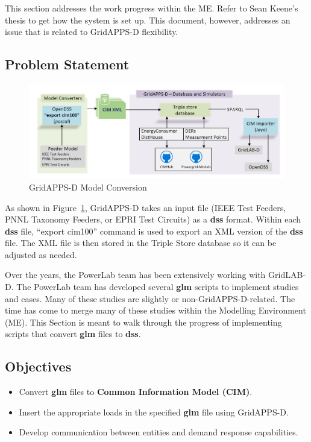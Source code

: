 This section addresses the work progress within the ME. Refer to Sean Keene's thesis to get how the system is set up. This document, however, addresses an issue that is related to GridAPPS-D flexibility. 

\subsection{Problem Statement}

\begin{figure}[htp!]
    \centering
    \includegraphics[width=0.7\columnwidth]{Pictures/model_conversion.png}
    \caption{GridAPPS-D Model Conversion}
    \label{fig:me_gridappsd}
\end{figure}

As shown in Figure~\ref{fig:me_gridappsd}, GridAPPS-D takes an input file (IEEE Test Feeders, PNNL Taxonomy Feeders, or EPRI Test Circuits) as a \textbf{dss} format. Within each \textbf{dss} file,
``export cim100'' command is used to export an XML version of the \textbf{dss} file. The XML file is then stored in the Triple Store database so it can be adjusted as needed. 


Over the years, the PowerLab team has been extensively working with GridLAB-D. The PowerLab team has developed several \textbf{glm} scripts to implement studies and cases. Many of these studies are slightly or non-GridAPPS-D-related. 
The time has come to merge many of these studies within the Modelling Environment (ME). This Section is meant to walk through the progress of implementing scripts that convert \textbf{glm} files to \textbf{dss}.

\subsection{Objectives}
\begin{itemize}
    \item Convert \textbf{glm} files to \textbf{Common Information Model (CIM)}.
    \item Insert the appropriate loads in the specified \textbf{glm} file using GridAPPS-D.
    \item Develop communication between entities and demand response capabilities.
\end{itemize}


